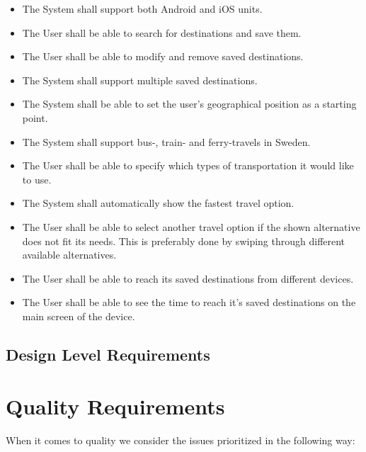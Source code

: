 \documentclass[a4paper]{article}
\begin{document}
				\begin{itemize}
					\item The System shall support both Android and iOS units.
					\item The User shall be able to search for destinations and save them.
					\item The User shall be able to modify and remove saved destinations.
					\item The System shall support multiple saved destinations.
					\item The System shall be able to set the user's geographical position as a starting point.
					\item The System shall support bus-, train- and ferry-travels in Sweden.
					\item The User shall be able to specify which types of transportation it would like to use. 
					\item The System shall automatically show the fastest travel option.
					\item The User shall be able to select another travel option if the shown alternative does not fit its needs. This 				is preferably done by swiping through different available alternatives.
					\item The User shall be able to reach its saved destinations from different devices.
					\item The User shall be able to see the time to reach it's saved destinations on the main screen of the device.
				\end{itemize}
	\subsection{Design Level Requirements}
	\section{Quality Requirements}
		When it comes to quality we consider the issues prioritized in the following way:
		
\end{document}
